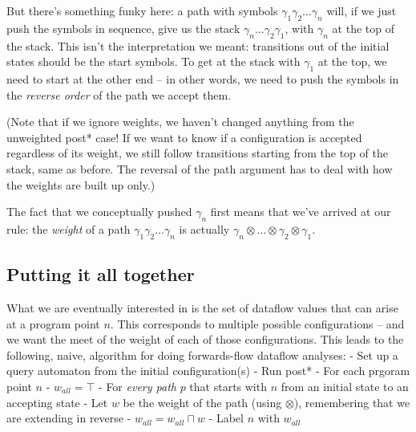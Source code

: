 \documentclass{article}
\newcommand{\meet}{\sqcap}
\newcommand{\extend}{\otimes}
\begin{document}
But there's something funky here: a path with symbols $\gamma_1
\gamma_2 \dots \gamma_n$ will, if we just push the symbols in
sequence, give us the stack $\gamma_n \dots \gamma_2 \gamma_1$, with
$\gamma_n$ at the top of the stack. This isn't the interpretation we
meant: transitions out of the initial states should be the start
symbols. To get at the stack with $\gamma_1$ at the top, we need to
start at the other end -- in other words, we need to push the symbols
in the \emph{reverse order} of the path we accept them.

(Note that if we ignore weights, we haven't changed anything from the
unweighted post* case! If we want to know if a configuration is
accepted regardless of its weight\footnotemark, we still follow
transitions starting from the top of the stack, same as before. The
reversal of the path argument has to deal with how the weights are
built up only.)

The fact that we conceptually pushed $\gamma_n$ first means that we've
arrived at our rule: the \emph{weight} of a path $\gamma_1 \gamma_2
\dots \gamma_n$ is actually $\gamma_n \extend \dots \extend \gamma_2
\extend \gamma_1$.







\subsection{Putting it all together}

What we are eventually interested in is the set of dataflow
values that can arise at a program point $n$. This corresponds to
multiple possible configurations -- and we want the meet of the weight
of each of those configurations. This leads to the following, naive,
algorithm for doing forwards-flow dataflow analyses:
    - Set up a query automaton from the initial configuration(s)
    - Run post*
    - For each prgoram point $n$
          - $w_{all} = \top$
          - For \emph{every path} $p$ that starts with $n$ from an
            initial state to an accepting state
              - Let $w$ be the weight of the path (using $\extend$),
                remembering that we are extending in reverse
              - $w_{all} = w_{all} \meet w$
          - Label $n$ with $w_{all}$
\end{document}
